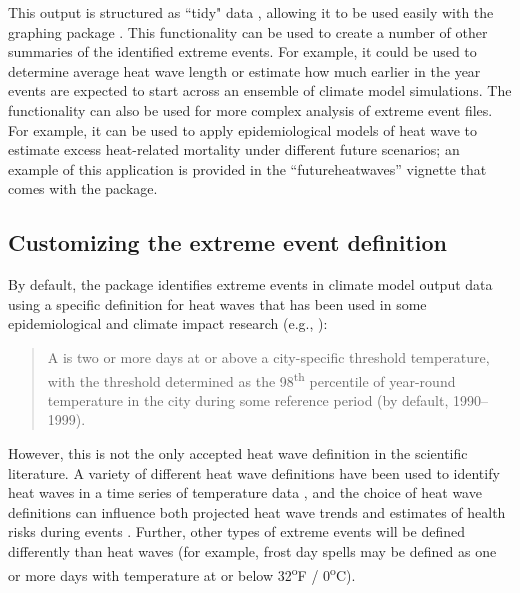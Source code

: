 This output is structured as ``tidy" data \citep{wickham2014tidy},
allowing it to be used easily with the graphing package
 \citep{ggplot2}. This functionality can be used to
create a number of other summaries of the identified extreme events. For
example, it could be used to determine average heat wave length or
estimate how much earlier in the year events are expected to start
across an ensemble of climate model simulations. The functionality can
also be used for more complex analysis of extreme event files. For
example, it can be used to apply epidemiological models of heat wave to
estimate excess heat-related mortality under different future scenarios;
an example of this application is provided in the ``futureheatwaves''
vignette that comes with the package.

\subsection{Customizing the extreme event
definition}\label{customizing-the-extreme-event-definition}

By default, the package identifies extreme events in climate model
output data using a specific definition for heat waves that has been
used in some epidemiological and climate impact research (e.g.,
\citet{anderson2009weather}):

\begin{quote}
A  is two or more days at or above a city-specific
threshold temperature, with the threshold determined as the
98\textsuperscript{th} percentile of year-round temperature in the city
during some reference period (by default, 1990--1999).
\end{quote}

However, this is not the only accepted heat wave definition in the
scientific literature. A variety of different heat wave definitions have
been used to identify heat waves in a time series of temperature data
\citep{smith2013heat}, and the choice of heat wave definitions can
influence both projected heat wave trends \citep{smith2013heat} and
estimates of health risks during events
\citep{chen2015influence, kent2014heat}. Further, other types of extreme
events will be defined differently than heat waves (for example, frost
day spells may be defined as one or more days with temperature at or
below 32\textsuperscript{o}F / 0\textsuperscript{o}C).


